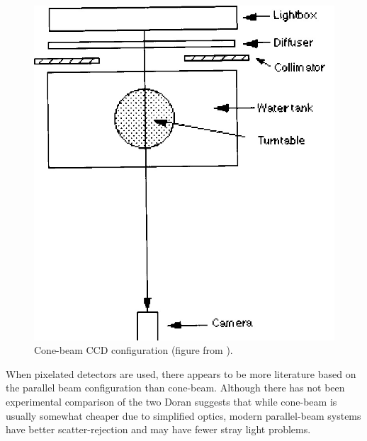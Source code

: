 \documentclass[12pt]{article}
\begin{document}
\begin{figure}[H]
\centering
\includegraphics[scale=0.3]{Wolodzko_1999_conesetup.jpg}
\caption{Cone-beam CCD configuration (figure from \cite{Wolodzko:1999}).}
\end{figure}

When pixelated detectors are used, there appears to be more literature based on the parallel beam configuration than cone-beam. Although there has not been experimental comparison of the two Doran suggests that while cone-beam is usually somewhat cheaper due to simplified optics, modern parallel-beam systems have better scatter-rejection and may have fewer stray light problems. \cite{Doran:2008kh, Olding:2011eta, Thomas:2011eja}



 

 




\end{document}
